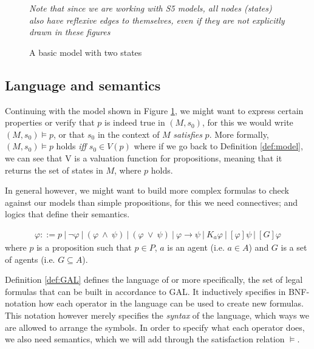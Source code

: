 \begin{figure}[h]
	\label{fig:basicEM}
	\centering
	\caption{A basic model with two states}
	\break \textit{Note that since we are working with S5 models, all nodes (states) also have reflexive edges to themselves, even if they are not explicitly drawn in these figures}
\end{figure}

\subsection{Language and semantics}

Continuing with the model shown in Figure \ref{fig:basicEM}, we might want to express certain properties or verify that $p$ is indeed true in $(M,s_0)$, for this we would write $(M,s_0) \models p$, or that $s_0$ in the context of $M$ \textit{satisfies} $p$. More formally, $(M,s_0) \models p$ holds \textit{iff} $s_0 \in V(p)$ where if we go back to Definition \ref{def:model}, we can see that V is a valuation function for propositions, meaning that it returns the set of states in $M$, where $p$ holds. 

In general however, we might want to build more complex formulas to check against our models than simple propositions, for this we need connectives; and logics that define their semantics.

\begin{definition} \hfill
	\label{def:GAL}
 	\begin{align*}
		\varphi ::= p \ | ~\neg\varphi ~|~ (\varphi~\wedge~\psi) ~|~ (\varphi~\vee~\psi) ~|~ \varphi 							
		\rightarrow \psi ~|~ K_a\varphi ~|~ [\varphi]\psi  ~|~ [G]\varphi
	\end{align*}
	where $p$ is a proposition such that $p \in P$, $a$ is an agent (i.e. $a \in A$) and $G$ is a set of agents (i.e. $G \subseteq A$).
\end{definition}

Definition \ref{def:GAL} defines the language of  or more specifically, the set of legal formulas that can be built in accordance to GAL. It inductively specifies in BNF-notation how each operator in the language can be used to create new formulas. This notation however merely specifies the \textit{syntax} of the language, which ways we are allowed to arrange the symbols. In order to specify what each operator does, we also need semantics, which we will add through the satisfaction relation $\models$.

